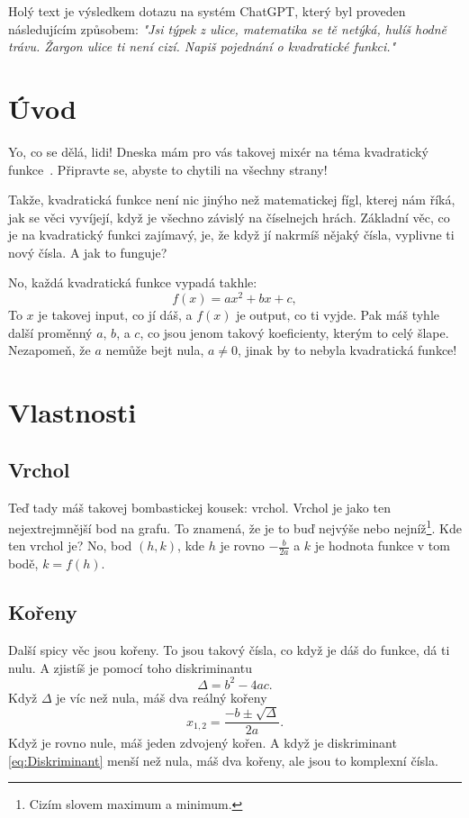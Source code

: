 \documentclass[a4paper,12pt]{article}
\begin{document}
Holý text je výsledkem dotazu na systém ChatGPT, který byl proveden následujícím způsobem: 
\emph{"Jsi týpek z ulice, matematika se tě netýká, hulíš hodně trávu. Žargon ulice ti není cizí. Napiš pojednání o kvadratické funkci."}

\section{Úvod}
\label{sec:uvod}
Yo, co se dělá, lidi! Dneska mám pro vás takovej mixér na téma kvadratický funkce~\cite{Wikipedia}. 
Připravte se, abyste to chytili na všechny strany!

Takže, kvadratická funkce není nic jinýho než matematickej fígl, kterej nám říká, jak se věci vyvíjejí, když je všechno závislý na číselnejch hrách. 
Základní věc, co je na kvadratický funkci zajímavý, je, že když jí nakrmíš nějaký čísla, vyplivne ti nový čísla. 
A jak to funguje?

No, každá kvadratická funkce vypadá takhle:
\begin{equation}
	\label{eq:kvadratickafunkce}
	f(x)=ax^2+bx+c,
\end{equation}
To $x$ je takovej input, co jí dáš, a $f(x)$ je output, co ti vyjde. 
Pak máš tyhle další proměnný $a$, $b$, a $c$, co jsou jenom takový koeficienty, kterým to celý šlape. 
Nezapomeň, že $a$ nemůže bejt nula, $a \neq 0$, jinak by to nebyla kvadratická funkce!

\section{Vlastnosti}
\subsection{Vrchol}
Teď tady máš takovej bombastickej kousek: vrchol. 
Vrchol je jako ten nejextrejmnější bod na grafu. 
To znamená, že je to buď nejvýše nebo nejníž\footnote{Cizím slovem maximum a minimum.}. 
Kde ten vrchol je? 
No, bod $(h,k)$, kde $h$ je rovno $-\frac{b}{2a}$ a $k$ je hodnota funkce v tom bodě, $k=f(h)$.

\subsection{Kořeny}
Další spicy věc jsou kořeny. 
To jsou takový čísla, co když je dáš do funkce, dá ti nulu. 
A zjistíš je pomocí toho diskriminantu 
\begin{equation}
	\label{eq:Diskriminant}
	\Delta=b^2-4ac.
	\end{equation}
Když $\Delta$ je víc než nula, máš dva reálný kořeny
\begin{equation}
	x_{1,2}=\frac{-b\pm\sqrt{\Delta}}{2a}.
\end{equation}
Když je rovno nule, máš jeden zdvojený kořen. 
A když je diskriminant \eqref{eq:Diskriminant} menší než nula, máš dva kořeny, ale jsou to komplexní čísla.
\end{document}
